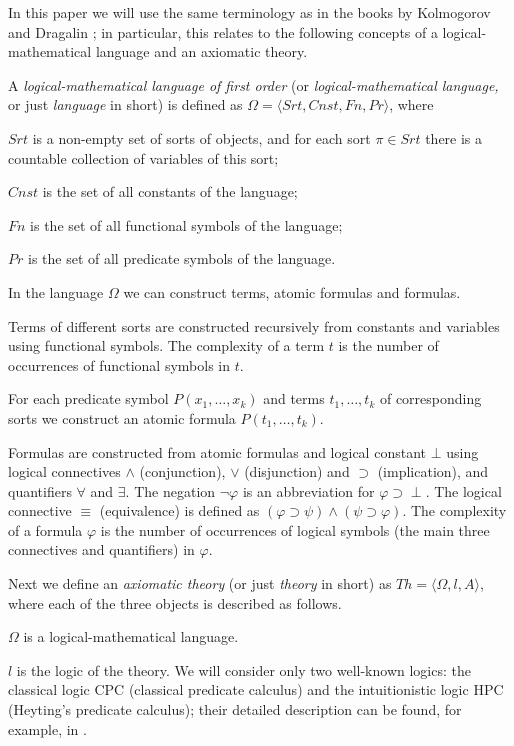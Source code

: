 \documentclass{asl}
\theoremstyle{definition}
\begin{document}
In this paper we will use the same terminology as in the books by Kolmogorov and Dragalin \cite{kolm82,drag87}; in particular, this relates to the following concepts of a logical-mathematical language and an axiomatic theory.

A \textit{logical-mathematical language of first order} (or \textit{logical-mathematical language,} or just \textit{language} in short) is defined as $ \Omega=\langle Srt, Cnst, Fn, Pr \rangle $, where

$ Srt $ is a non-empty set of sorts of objects, and for each sort $ \pi \in Srt $ there is a countable collection of variables of this sort;

$ Cnst $ is the set of all constants of the language;

$ Fn $ is the set of all functional symbols of the language;

$ Pr $ is the set of all predicate symbols of the language.

In the language $ \Omega $ we can construct terms, atomic formulas and formulas. 

Terms of different sorts are constructed recursively from constants and variables using functional symbols. The complexity of a term $ t $ is the number of occurrences of functional symbols in $ t $.

For each predicate symbol $P\left(x_1,\ldots,x_k \right) $ and terms $ t_1,\ldots,t_k $ of corresponding sorts we construct an atomic formula $P\left(t_1,\ldots,t_k \right) $.

Formulas are constructed from atomic formulas and logical constant $ \bot $ using logical connectives $ \wedge $ (conjunction), $ \vee $ (disjunction) and $ \supset $ (implication), and quantifiers $ \forall $ and $ \exists $. The negation $\neg\varphi$ is an abbreviation for $\varphi\supset\perp$.
The logical connective $ \equiv $ (equivalence) is defined as $\left( \varphi\supset\psi\right) \wedge\left( \psi\supset\varphi\right)  $. The complexity of a formula $ \varphi $ is the number of occurrences of logical symbols (the main three connectives and quantifiers) in $ \varphi $.

Next we define an \textit{axiomatic theory} (or just \textit{theory} in short)  as $ Th = \langle \Omega, l, A \rangle $, where each of the three objects is described as follows.

$ \Omega $ is a logical-mathematical language.

$ l $ is the logic of the theory. We will consider only two well-known logics: the classical logic CPC (classical predicate calculus) and the intuitionistic logic HPC (Heyting's predicate calculus); their detailed description can be found, for example, in \cite{drag87}.
\end{document}
